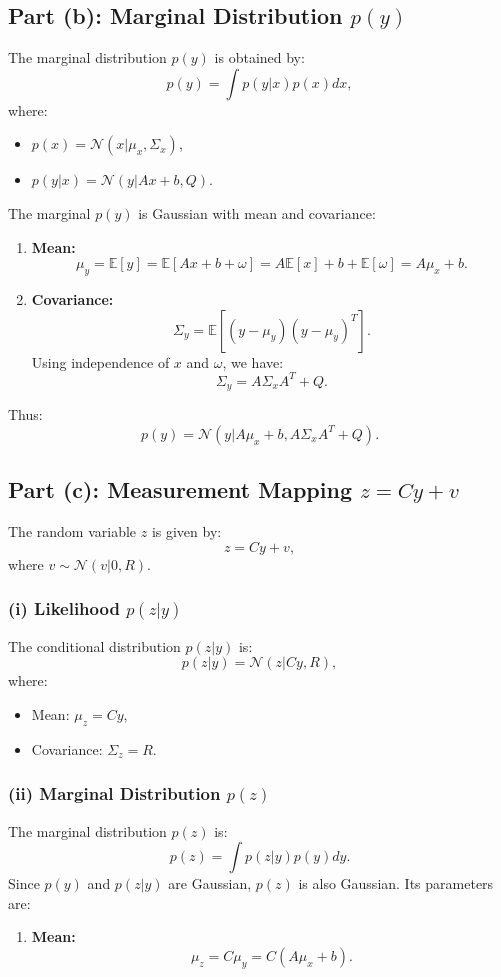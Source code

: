 \documentclass[12pt]{article}
\begin{document}
\begin{itemize}
\subsection*{Part (b): Marginal Distribution \( p(y) \)}
The marginal distribution \( p(y) \) is obtained by:
\[
p(y) = \int p(y|x)p(x)dx,
\]
where:
\begin{itemize}
    \item \( p(x) = \mathcal{N}(x | \mu_x, \Sigma_x) \),
    \item \( p(y|x) = \mathcal{N}(y | Ax + b, Q) \).
\end{itemize}

The marginal \( p(y) \) is Gaussian with mean and covariance:
\begin{enumerate}
    \item \textbf{Mean:}
    \[
    \mu_y = \mathbb{E}[y] = \mathbb{E}[Ax + b + \omega] = A\mathbb{E}[x] + b + \mathbb{E}[\omega] = A\mu_x + b.
    \]
    
    \item \textbf{Covariance:}
    \[
    \Sigma_y = \mathbb{E}[(y - \mu_y)(y - \mu_y)^T].
    \]
    Using independence of \( x \) and \( \omega \), we have:
    \[
    \Sigma_y = A\Sigma_xA^T + Q.
    \]
\end{enumerate}

Thus:
\[
p(y) = \mathcal{N}(y | A\mu_x + b, A\Sigma_xA^T + Q).
\]

\subsection*{Part (c): Measurement Mapping \( z = Cy + v \)}
The random variable \( z \) is given by:
\[
z = Cy + v,
\]
where \( v \sim \mathcal{N}(v | 0, R) \).

\subsubsection*{(i) Likelihood \( p(z|y) \)}
The conditional distribution \( p(z|y) \) is:
\[
p(z|y) = \mathcal{N}(z | Cy, R),
\]
where:
\begin{itemize}
    \item Mean: \( \mu_z = Cy \),
    \item Covariance: \( \Sigma_z = R \).
\end{itemize}

\subsubsection*{(ii) Marginal Distribution \( p(z) \)}
The marginal distribution \( p(z) \) is:
\[
p(z) = \int p(z|y)p(y)dy.
\]
Since \( p(y) \) and \( p(z|y) \) are Gaussian, \( p(z) \) is also Gaussian. Its parameters are:
\begin{enumerate}
    \item \textbf{Mean:}
    \[
    \mu_z = C\mu_y = C(A\mu_x + b).
    \]


\end{enumerate}
\end{itemize}
\end{document}
